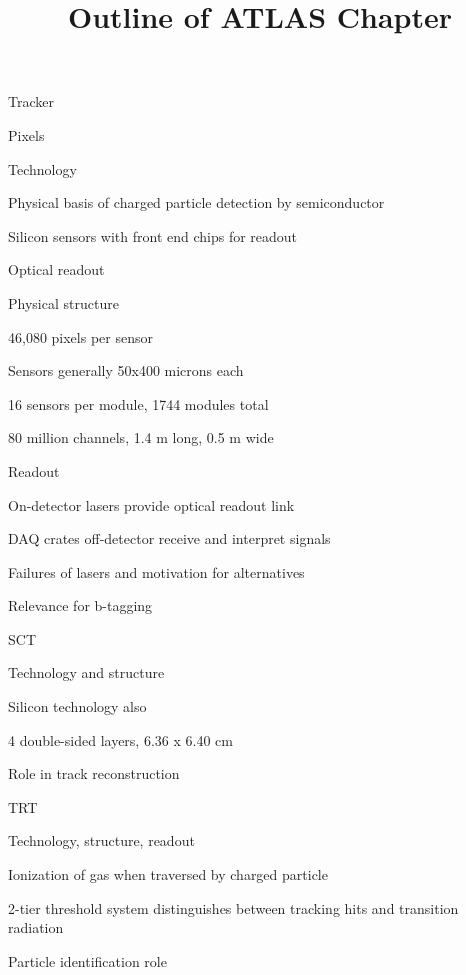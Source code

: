 \documentclass[11pt]{report}
\title{Outline of ATLAS Chapter}
\begin{document}
\begin{outline}

	\item Tracker
	\begin{outline}
		\item Pixels
		\begin{outline}
			\item Technology
			\begin{outline}
				\item Physical basis of charged particle detection by semiconductor
				\item Silicon sensors with front end chips for readout
				\item Optical readout
			\end{outline}
			\item Physical structure
			\begin{outline}
				\item 46,080 pixels per sensor
				\item Sensors generally 50x400 microns each
				\item 16 sensors per module, 1744 modules total
				\item 80 million channels, 1.4 m long, 0.5 m wide
			\end{outline}
			\item Readout
			\begin{outline}
				\item On-detector lasers provide optical readout link
				\item DAQ crates off-detector receive and interpret signals
				\item Failures of lasers and motivation for alternatives
			\end{outline}
			\item Relevance for b-tagging
		\end{outline}
		\item SCT
		\begin{outline}
			\item Technology and structure
			\begin{outline}
				\item Silicon technology also
				\item 4 double-sided layers, 6.36 x 6.40 cm
			\end{outline}
			\item Role in track reconstruction
		\end{outline}
		\item TRT
		\begin{outline}
			\item Technology, structure, readout
			\begin{outline}
				\item Ionization of gas when traversed by charged particle
				\item 2-tier threshold system distinguishes between tracking hits and transition radiation
			\end{outline}
			\item Particle identification role
		\end{outline}
	\end{outline}
	

\end{outline}
\end{document}
